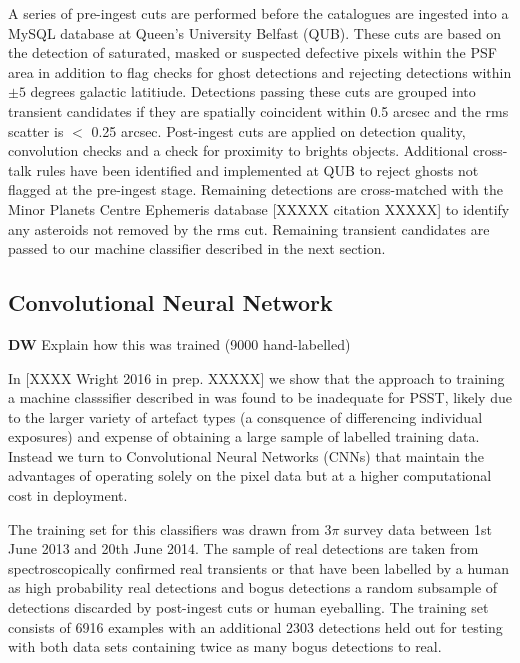 \documentclass[a4paper,fleqn,usenatbib]{mnras}
\begin{document}
A series of pre-ingest cuts are performed before the catalogues are ingested into a MySQL database at Queen's University Belfast (QUB).  These cuts are based on the detection of saturated, masked or suspected defective pixels within the PSF area in addition to flag checks for ghost detections and rejecting detections within $\pm 5$ degrees galactic latitiude. Detections passing these cuts are grouped into transient candidates if they are spatially coincident within 0.5 arcsec and the rms scatter is $<$ 0.25 arcsec.  Post-ingest cuts are applied on detection quality, convolution checks and a check for proximity to brights objects.  Additional cross-talk rules have been identified and implemented at QUB to reject ghosts
not flagged at the pre-ingest stage.  Remaining detections are cross-matched with the Minor Planets Centre Ephemeris database [XXXXX citation XXXXX] to identify any asteroids not 
removed by the rms cut.  Remaining transient candidates are passed to our machine classifier described in the next section.

\subsection{Convolutional Neural Network}

\textbf{DW}
Explain how this was trained (9000 hand-labelled) 

In [XXXX Wright 2016 in prep. XXXXX] we show that the approach to training a machine classsifier described in \citet{Wright15} was found to be inadequate for PSST, likely due to the larger variety of artefact types (a consquence of differencing individual exposures) and expense of obtaining a large sample of labelled training data.  Instead we turn to Convolutional Neural Networks (CNNs) that maintain the advantages of operating solely on the pixel data but at a higher computational cost in deployment.  

The training set for this classifiers was drawn from $3\pi$ survey data between 1st June 2013 and 20th June 2014.  The sample of real detections are taken from spectroscopically confirmed real transients or that have been labelled by a human as high probability real detections and bogus detections a random subsample of detections discarded by post-ingest cuts or human eyeballing.  The training set consists of 6916 examples with an additional 2303 detections held out for testing with both data sets containing twice as many bogus detections to real.
\end{document}
